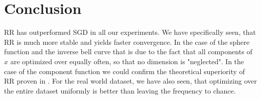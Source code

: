 \documentclass[10pt,conference,compsocconf]{IEEEtran}
\begin{document}
\section{Conclusion}

RR has outperformed SGD in all our experiments. We have specifically seen, that RR is much more stable and yields faster convergence. In the case of the sphere function and the inverse bell curve that is due to the fact that all components of $x$ are optimized over equally often, so that no dimension is "neglected". In the case of the component function we could confirm the theoretical superiority of RR proven in \cite{COMPONENTFUNCTION}. For the real world dataset, we have also seen, that optimizing over the entire dataset uniformly is better than leaving the frequency to chance.

\newpage


\end{document}
